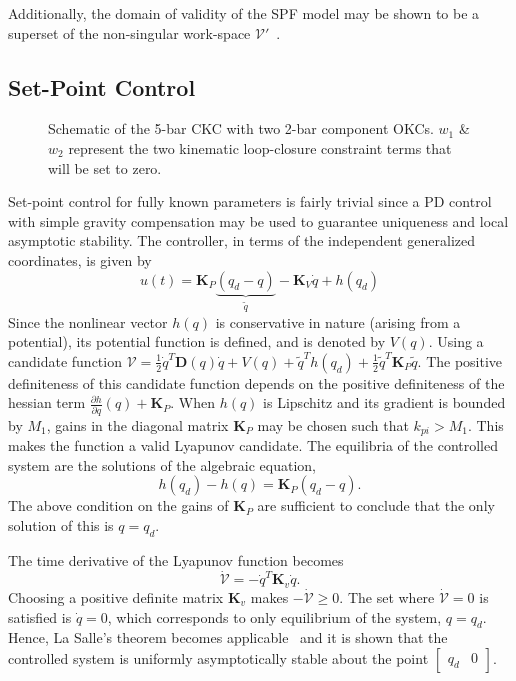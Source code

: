 \documentclass[10pt,final,journal,letterpaper,oneside,twocolumn]{IEEEtran}
\begin{document}
Additionally, the domain of validity of the SPF model may be shown to
be a superset of the non-singular work-space $\mathcal{V}'$~\cite{wang_domain_2004}. 
\subsection{Set-Point Control}
\label{sec:set-point-control}
\begin{figure}[!h]
  \centering
  \caption{Schematic of the 5-bar CKC with two 2-bar component
    OKCs. $w_1$ \& $w_2$ represent the two kinematic loop-closure
    constraint terms that will be set to zero.}
  \label{fig:schem5}
\end{figure}

Set-point control for fully known parameters is fairly trivial since a
PD control with simple gravity compensation may be used to guarantee
uniqueness and local asymptotic stability. The controller, in terms of
the independent generalized coordinates, is given by
\begin{equation}
  u(t) = \bm{K}_P\underbrace{(q_d-q)}_{\tilde{q}} - \bm{K}_V\dot{q} +
  h(q_d)
  \label{eq:setptctrl}
\end{equation}
Since the nonlinear vector $h(q)$ is conservative in nature (arising
from a potential), its potential function is defined, and is denoted
by $V(q)$. Using a candidate function $\mathcal{V} =
\frac{1}{2}\dot{q}^T\bm{D}(q)\dot{q} + V(q) + \tilde{q}^Th(q_d) +
\frac{1}{2}\tilde{q}^T\bm{K}_P\tilde{q} $. The positive definiteness
of this candidate function depends on the positive definiteness of the
hessian term $\frac{\partial h}{\partial q}(q) + \bm{K}_P$. When
$h(q)$ is Lipschitz and its gradient is bounded by $M_1$, gains in the
diagonal matrix $\bm{K}_P$ may be chosen such that $k_{pi} >
M_1$. This makes the function a valid Lyapunov candidate. The
equilibria of the controlled system are the solutions of the algebraic
equation,
\begin{equation}
  h(q_d) - h(q) = \bm{K}_P(q_d-q).
\end{equation}
The above condition on the gains of $\bm{K}_P$ are sufficient to
conclude that the only solution of this is $q=q_d$.

The time derivative of the Lyapunov function becomes
\begin{equation*}
  \dot{\mathcal{V}} = -\dot{q}^T\bm{K}_v\dot{q}.
\end{equation*}
Choosing a positive definite matrix $\bm{K}_v$ makes
$-\dot{\mathcal{V}} \geq 0$. The set where $\dot{\mathcal{V}}=0$ is
satisfied is $\dot{q}=0$, which corresponds to only equilibrium of the
system, $q=q_d$. Hence, La Salle's theorem becomes
applicable~\cite{vidyasagar1978nonlinear} and it is shown that the
controlled system is uniformly asymptotically stable about the point
$\begin{bmatrix} q_d & 0 \end{bmatrix}$.
\end{document}
